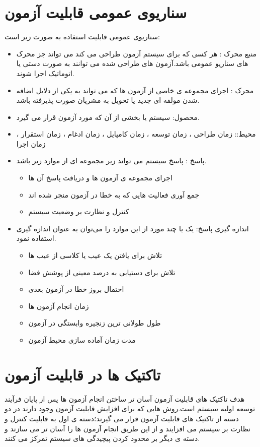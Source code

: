 \section{سناریوی عمومی قابلیت آزمون}
سناریو‌ی عمومی قابلیت استفاده به صورت زیر است:
\begin{itemize}
\item
منبع محرک : هر کسی که برای سیستم آزمون طراحی می کند می تواند جز محرک های سناریو عمومی باشد.آزمون های طراحی شده می توانند به صورت دستی یا اتوماتیک اجرا شوند.
\item
محرک : اجرای مجموعه ی خاصی از آزمون ها که می تواند به یکی از دلایل اضافه شدن مولفه ای جدید یا تحویل به مشریان صورت پذیرفته باشد.
\item
محصول: سیستم یا بخشی از آن که مورد آزمون قرار می گیرد.
\item
محیط:: زمان طراحی ، زمان توسعه ، زمان کامپایل ، زمان ادغام ، زمان استقرار ، زمان اجرا
\item
پاسخ : 
پاسخ سیستم می تواند زیر مجموعه ای از موارد زیر باشد.
\begin{itemize}
\item
اجرای مجموعه ی آزمون ها و دریافت پاسخ آن ها
\item
جمع آوری فعالیت هایی که به خطا در آزمون منجر شده اند
\item
کنترل و نظارت بر وضعیت سیستم
\end{itemize}

\item
اندازه گیری پاسخ: یک یا چند مورد از این موارد را می‌توان به عنوان اندازه گیری استفاده نمود.
\begin{itemize}
\item
تلاش برای یافتن یک عیب یا کلاسی از عیب ها
\item
تلاش برای دستیابی به درصد معینی از پوشش فضا
\item
احتمال بروز خطا در آزمون بعدی
\item
زمان انجام آزمون ها
\item
طول طولانی ترین زنجیره وابستگی در آزمون
\item
مدت زمان آماده سازی محیط آزمون
\end{itemize}
\end{itemize}

\section{تاکتیک ها در قابلیت آزمون}
هدف تاکتیک های قابلیت آزمون آسان تر ساختن انجام آزمون ها پس از پایان فرآیند توسعه اولیه سیستم است.روش هایی که برای افزایش قابلیت آزمون وجود دارند در دو دسته از تاکتیک های قابلیت آزمون قرار می گیرند؛‌دسته ی اول به قابلیت کنترل و نظارت بر سیستم می افزایند و از این طریق انجام آزمون ها را آسان تر می سازند و دسته ی دیگر بر محدود کردن پیچیدگی های سیستم تمرکز می کنند.
